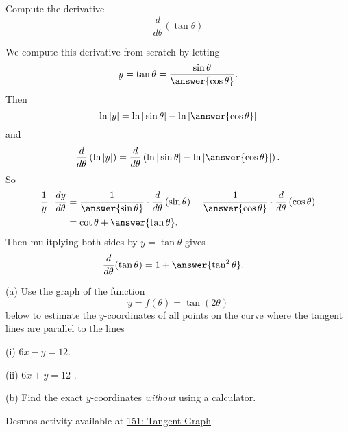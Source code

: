 \documentclass{ximera}
\begin{document}
\begin{question}  \label{Ex:dsf9t5gg3w}
Compute the derivative
\[
     \frac{d}{d\theta} \left( \tan\theta  \right) 
\]

\begin{explanation}
We compute this derivative from scratch by letting 
\[
    y = \tan\theta = \frac{\sin\theta}{\answer{\cos\theta}} .
\]
Then
\[
   \ln |y| = \ln |\sin\theta| - \ln | \answer{\cos\theta}   |
\]
and
\[
      \frac{d}{d\theta} \left( \ln |y| \right) = \frac{d}{d\theta} \left( \ln |\sin\theta| - \ln | \answer{\cos\theta}| \right) .
\]
So
\begin{align*}
   \frac{1}{y} \cdot \frac{dy}{d\theta} &= \frac{1}{\answer{\sin\theta}} \cdot \frac{d}{d\theta}\left( \sin\theta \right) - \frac{1}{\answer{\cos\theta}} \cdot \frac{d}{d\theta}\left( \cos\theta \right) \\
                &= \cot\theta + \answer{\tan\theta} .
\end{align*}
Then mulitplying both sides by $y=\tan\theta$ gives
\begin{align*}
          \frac{d}{d\theta}(\tan \theta) &= 1 + \answer{\tan^2\theta} . 
\end{align*}

\end{explanation}
\end{question}

\begin{question}  \label{Qerdf4ghbhh}
(a) Use the graph of the function
\[
 y = f(\theta) = \tan (2\theta)
\]     
below to estimate the $y$-coordinates of all points on the curve where the tangent lines are parallel to the lines

(i)  $6x - y = 12$.

(ii) $6x + y = 12$ .

(b) Find the exact $y$-coordinates \emph{without} using a calculator.

\begin{onlineOnly}
    \begin{center}
\end{center}
\end{onlineOnly}

Desmos activity available at \href{https://www.desmos.com/calculator/obz6ghw3ej}{151: Tangent Graph}

\end{question}
\end{document}
